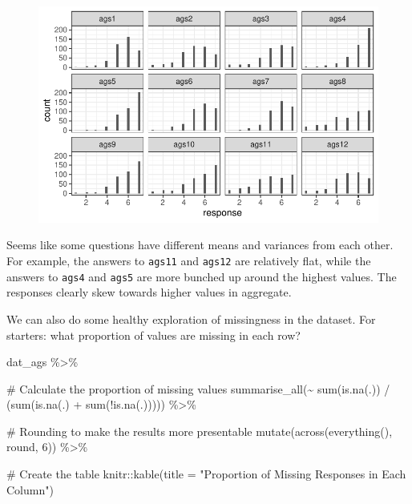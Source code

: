 \documentclass[
  letterpaper,
  DIV=11,
  numbers=noendperiod]{scrreprt}
\newenvironment{Shaded}{\begin{snugshade}}{\end{snugshade}}
\newcommand{\AttributeTok}[1]{\textcolor[rgb]{0.40,0.45,0.13}{#1}}
\newcommand{\CommentTok}[1]{\textcolor[rgb]{0.37,0.37,0.37}{#1}}
\newcommand{\DecValTok}[1]{\textcolor[rgb]{0.68,0.00,0.00}{#1}}
\newcommand{\FunctionTok}[1]{\textcolor[rgb]{0.28,0.35,0.67}{#1}}
\newcommand{\NormalTok}[1]{\textcolor[rgb]{0.00,0.23,0.31}{#1}}
\newcommand{\SpecialCharTok}[1]{\textcolor[rgb]{0.37,0.37,0.37}{#1}}
\newcommand{\StringTok}[1]{\textcolor[rgb]{0.13,0.47,0.30}{#1}}
\begin{document}
\begin{figure}[H]

{\centering \includegraphics{./traditional-cfa-workflow_files/figure-pdf/unnamed-chunk-3-1.pdf}

}

\end{figure}

Seems like some questions have different means and variances from each
other. For example, the answers to \texttt{ags11} and \texttt{ags12} are
relatively flat, while the answers to \texttt{ags4} and \texttt{ags5}
are more bunched up around the highest values. The responses clearly
skew towards higher values in aggregate.

We can also do some healthy exploration of missingness in the dataset.
For starters: what proportion of values are missing in each row?

\begin{Shaded}
\begin{Highlighting}[]
\NormalTok{dat\_ags }\SpecialCharTok{\%\textgreater{}\%} 
  
  \CommentTok{\# Calculate the proportion of missing values }
  \FunctionTok{summarise\_all}\NormalTok{(}\SpecialCharTok{\textasciitilde{}} \FunctionTok{sum}\NormalTok{(}\FunctionTok{is.na}\NormalTok{(.)) }\SpecialCharTok{/}\NormalTok{ (}\FunctionTok{sum}\NormalTok{(}\FunctionTok{is.na}\NormalTok{(.) }\SpecialCharTok{+} \FunctionTok{sum}\NormalTok{(}\SpecialCharTok{!}\FunctionTok{is.na}\NormalTok{(.))))) }\SpecialCharTok{\%\textgreater{}\%} 
  
  \CommentTok{\# Rounding to make the results more presentable}
  \FunctionTok{mutate}\NormalTok{(}\FunctionTok{across}\NormalTok{(}\FunctionTok{everything}\NormalTok{(), round, }\DecValTok{6}\NormalTok{)) }\SpecialCharTok{\%\textgreater{}\%} 
  
  \CommentTok{\# Create the table}
\NormalTok{  knitr}\SpecialCharTok{::}\FunctionTok{kable}\NormalTok{(}\AttributeTok{title =} \StringTok{"Proportion of Missing Responses in Each Column"}\NormalTok{) }
\end{Highlighting}
\end{Shaded}
\end{document}
